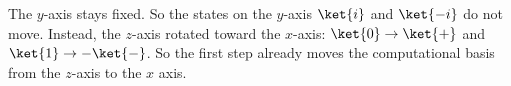 \begin{enumerate}
\begin{figure}[!htp]
    \end{figure}

    \noindent
    The $y$-axis stays fixed. So the states on the $y$-axis $\ket{i}$ and $\ket{-i}$ do not move. Instead, the $z$-axis rotated toward the $x$-axis: $\ket{0} \rightarrow \ket{+}$ and $\ket{1} \rightarrow -\ket{-}$. So the first step already moves the computational basis from the $z$-axis to the $x$ axis.


\end{enumerate}
